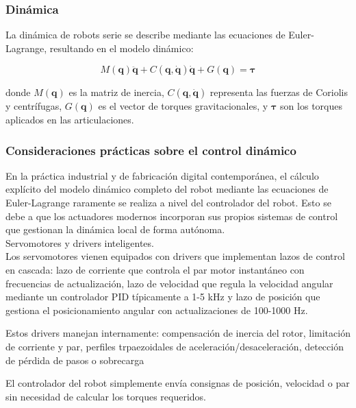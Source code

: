 \subsubsection{Dinámica}

La dinámica de robots serie se describe mediante las ecuaciones de Euler-Lagrange, resultando en el modelo dinámico:

\begin{equation}
M(\mathbf{q})\ddot{\mathbf{q}} + C(\mathbf{q}, \dot{\mathbf{q}})\dot{\mathbf{q}} + G(\mathbf{q}) = \boldsymbol{\tau}
\end{equation}

donde $M(\mathbf{q})$ es la matriz de inercia, $C(\mathbf{q}, \dot{\mathbf{q}})$ representa las fuerzas de Coriolis y centrífugas, $G(\mathbf{q})$ es el vector de torques gravitacionales, y $\boldsymbol{\tau}$ son los torques aplicados en las articulaciones.

\subsubsection{Consideraciones prácticas sobre el control dinámico}

En la práctica industrial y de fabricación digital contemporánea, el cálculo explícito del modelo dinámico completo del robot mediante las ecuaciones de Euler-Lagrange raramente se realiza a nivel del controlador del robot. Esto se debe a que los actuadores modernos incorporan sus propios sistemas de control que gestionan la dinámica local de forma autónoma.\\

Servomotores y drivers inteligentes.\\
\noindent
Los servomotores vienen equipados con drivers que implementan lazos de control en cascada: lazo de corriente que controla el par motor instantáneo con frecuencias de actualización, lazo de velocidad que regula la velocidad angular mediante un controlador PID típicamente a 1-5 kHz y lazo de posición que gestiona el posicionamiento angular con actualizaciones de 100-1000 Hz.

Estos drivers manejan internamente: compensación de inercia del rotor, limitación de corriente y par, perfiles trpaezoidales de aceleración/desaceleración, detección de pérdida de pasos o sobrecarga

El controlador del robot simplemente envía consignas de posición, velocidad o par sin necesidad de calcular los torques requeridos.\\


